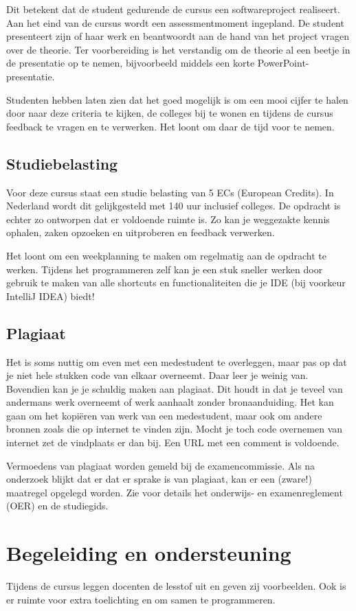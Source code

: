 Dit betekent dat de student gedurende de cursus een softwareproject realiseert.
Aan het eind van de cursus wordt een assessmentmoment ingepland. De student
presenteert zijn of haar werk en beantwoordt aan de hand van het project
vragen over de theorie. Ter voorbereiding is het verstandig om de theorie al 
een beetje in de presentatie op te nemen, 
bijvoorbeeld middels een korte PowerPoint-presentatie.

Studenten hebben laten zien dat het goed mogelijk is om een mooi cijfer te halen 
door naar deze criteria te kijken, de colleges bij te wonen en tijdens de cursus 
feedback te vragen en te verwerken. Het loont om daar de tijd voor te nemen.

\subsection{Studiebelasting}
Voor deze cursus staat een studie belasting van 5 ECs (European Credits). 
In Nederland wordt dit gelijkgesteld met 140 uur inclusief colleges.
De opdracht is echter zo ontworpen dat er voldoende ruimte is.
Zo kan je weggezakte kennis ophalen, zaken opzoeken en uitproberen
en feedback verwerken.

Het loont om een weekplanning te maken om regelmatig aan de opdracht 
te werken. Tijdens het programmeren zelf kan je een stuk sneller werken door 
gebruik te maken van alle shortcuts en functionaliteiten die je 
IDE (bij voorkeur IntelliJ IDEA) biedt!

\subsection{Plagiaat}
Het is soms nuttig om even met een medestudent te overleggen,
maar pas op dat je niet hele stukken code van elkaar overneemt.
Daar leer je weinig van. Bovendien kan je je schuldig maken aan 
plagiaat. Dit houdt in dat je teveel van andermans werk overneemt 
of werk aanhaalt zonder bronaanduiding. Het kan gaan om het kopiëren 
van werk van een medestudent, maar ook om andere bronnen zoals die op 
internet te vinden zijn. Mocht je toch code overnemen van internet 
zet de vindplaats er dan bij. Een URL met een comment is voldoende.

Vermoedens van plagiaat worden gemeld bij de examencommissie. 
Als na onderzoek blijkt dat er dat er sprake is
van plagiaat, kan er een (zware!) maatregel opgelegd worden.
Zie voor details het onderwijs- en examenreglement (OER) en de studiegids.

\section{Begeleiding en ondersteuning}
Tijdens de cursus leggen docenten de lesstof uit en geven zij voorbeelden.
Ook is er ruimte voor extra toelichting en om samen te programmeren.

